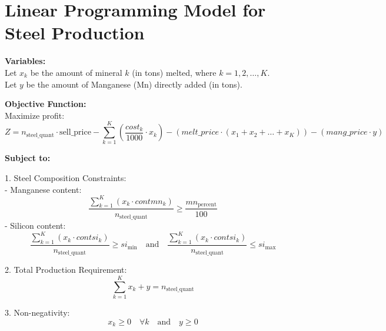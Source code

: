 \documentclass{article}
\begin{document}
\section*{Linear Programming Model for Steel Production}

\textbf{Variables:} \\
Let \( x_k \) be the amount of mineral \( k \) (in tons) melted, where \( k = 1, 2, \ldots, K \). \\
Let \( y \) be the amount of Manganese (Mn) directly added (in tons).

\textbf{Objective Function:} \\
Maximize profit:
\[
Z = n_{\text{steel\_quant}} \cdot \text{sell\_price} - \sum_{k=1}^{K} \left( \frac{cost_k}{1000} \cdot x_k \right) - (melt\_price \cdot (x_1 + x_2 + \ldots + x_K)) - (mang\_price \cdot y)
\]

\textbf{Subject to:}

1. Steel Composition Constraints: \\
   - Manganese content:
   \[
   \frac{\sum_{k=1}^{K} (x_k \cdot contmn_k)}{n_{\text{steel\_quant}}} \geq \frac{mn_{\text{percent}}}{100}
   \]
   - Silicon content:
   \[
   \frac{\sum_{k=1}^{K} (x_k \cdot contsi_k)}{n_{\text{steel\_quant}}} \geq si_{\text{min}} \quad \text{and} \quad \frac{\sum_{k=1}^{K} (x_k \cdot contsi_k)}{n_{\text{steel\_quant}}} \leq si_{\text{max}}
   \]

2. Total Production Requirement:
\[
\sum_{k=1}^{K} x_k + y = n_{\text{steel\_quant}}
\]

3. Non-negativity:
\[
x_k \geq 0 \quad \forall k \quad \text{and} \quad y \geq 0
\]
\end{document}
